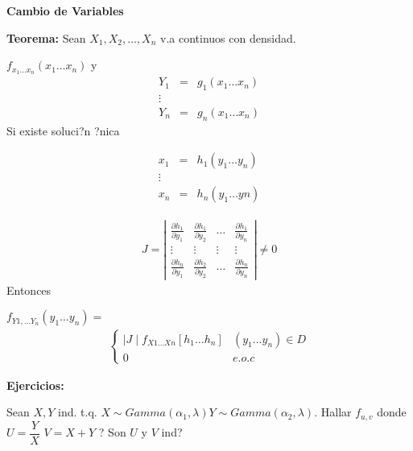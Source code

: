 \begin{center}
\textbf{Cambio de Variables}
\end{center}
\textbf{Teorema:} Sean $X_{1}, X_{2},\ldots,X _{n}$ v.a continuos con densidad.

\smallskip

$f_{x_{1}\ldots x_{n}}\left( x_{1} \ldots x_{n}\right)$   y
\begin{eqnarray*}
Y_{1} &=& g_{1} \left(x_{1}\ldots x_{n}  \right)\\
\vdots  \\
Y_{n} &=& g_{n} \left(x_{1}\ldots x_{n}  \right)
 \end{eqnarray*}
Si existe soluci?n ?nica 

\begin{eqnarray*}
x_{1} &=& h_{1} \left(y_{1}\ldots y_{n}  \right)\\
\vdots  \\
x_{n} &=& h_{n} \left(y_{1}\ldots y{n}  \right)
\end{eqnarray*}


 
\begin{eqnarray*}
J= \left| 
\begin{array}{cccc}
\frac{\partial h_{1}}{\partial y_{1}} & \frac{\partial h_{1}}{\partial y_{2}} & \ldots & \frac{\partial h_{1}}{\partial y_{n}}\\
\vdots & \vdots & \vdots & \vdots \\
\frac{\partial h_{n}}{\partial y_{1}} & \frac{\partial h_{2}}{\partial y_{2}} & \ldots & \frac{\partial h_{n}}{\partial y_{n}}
\end{array}
\right|
\neq 0
\end{eqnarray*}
 Entonces


$f_{Y1, \ldots Y_{n}}\left( y_{1} \ldots y_{n} \right) =$\begin{eqnarray*}
\begin{cases}
\mid J \mid f_{X1 \ldots Xn}\left[h_{1} \ldots h_{n}\right] & \left(y_{1} \ldots y_{n} \right) \in D \\  
0 & e.o.c
\end{cases}
\end{eqnarray*}

\textbf{Ejercicios:}

\smallskip

 Sean $X,Y$ ind. t.q. $X \sim Gamma \left( \alpha _{1}, \lambda\right) Y \sim Gamma \left( \alpha_{2}, \lambda \right)$. Hallar $f_{u,v}$ donde $ U= \dfrac{Y}{X}$ $V = X+Y$ ? Son $U$ y $V$ ind?
 
